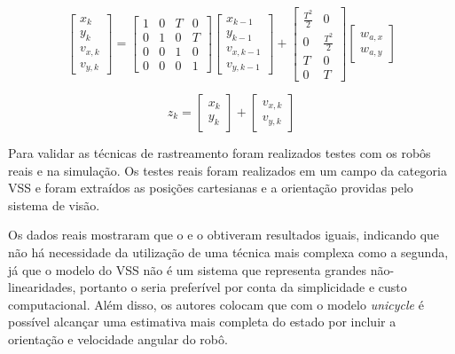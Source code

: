 \documentclass[acronym, symbols, table]{fei}
\begin{document}
\begin{equation}\label{eq:differential_equation_vsss_3}
	\begin{bmatrix}
		x_k \\ y_k \\ v_{x,k} \\ v_{y,k}
	\end{bmatrix} = 
	\begin{bmatrix}
		1 & 0 & T & 0 \\
		0 & 1 & 0 & T \\
		0 & 0 & 1 & 0 \\
		0 & 0 & 0 & 1
	\end{bmatrix}
	\begin{bmatrix}
		x_{k-1} \\ y_{k-1} \\ v_{x,k-1} \\ v_{y,k-1}
	\end{bmatrix} + 
	\begin{bmatrix}
		\frac{T^{2}}{2} & 0 \\
		0 & \frac{T^{2}}{2} \\
		T & 0 \\
		0 & T
	\end{bmatrix}
	\begin{bmatrix}
		w_{a,x} \\
		w_{a,y}
	\end{bmatrix}
\end{equation}

\begin{equation}\label{eq:differential_equation_vsss_4}
	z_k = 
	\begin{bmatrix}
		x_k \\ y_k
	\end{bmatrix} + 
	\begin{bmatrix}
		v_{x,k} \\ v_{y,k}
	\end{bmatrix}
\end{equation}

Para validar as técnicas de rastreamento foram realizados testes com os robôs reais e na simulação. Os testes reais foram realizados em um campo da categoria VSS e foram extraídos as posições cartesianas e a orientação providas pelo sistema de visão.

Os dados reais mostraram que o  e o  obtiveram resultados iguais, indicando que não há necessidade da utilização de uma técnica mais complexa como a segunda, já que o modelo do VSS não é um sistema que representa grandes não-linearidades, portanto o  seria preferível por conta da simplicidade e custo computacional. Além disso, os autores colocam que com o modelo \textit{unicycle} é possível alcançar uma estimativa mais completa do estado por incluir a orientação e velocidade angular do robô.
\end{document}
